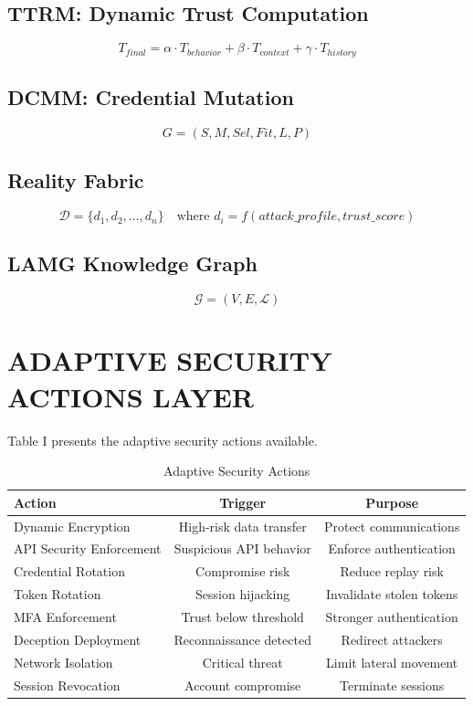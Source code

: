 \documentclass[10pt,journal,compsoc]{IEEEtran}
\begin{document}
\subsection{TTRM: Dynamic Trust Computation}
\begin{equation}
T_{final} = \alpha \cdot T_{behavior} + \beta \cdot T_{context} + \gamma \cdot T_{history}
\label{eq:trust}
\end{equation}

\subsection{DCMM: Credential Mutation}
\begin{equation}
G = (S, M, Sel, Fit, L, P)
\label{eq:genome}
\end{equation}

\subsection{Reality Fabric}
\begin{equation}
\mathcal{D} = \{d_1, d_2, \ldots, d_n\} \quad \text{where } d_i = f(attack\_profile, trust\_score)
\label{eq:deception}
\end{equation}

\subsection{LAMG Knowledge Graph}
\begin{equation}
\mathcal{G} = (V, E, \mathcal{L})
\label{eq:graph}
\end{equation}

\section{ADAPTIVE SECURITY ACTIONS LAYER}
Table I presents the adaptive security actions available.

\begin{table}[H]
\centering
\caption{Adaptive Security Actions}
\scriptsize
\begin{tabular}{|l|c|c|}
\hline
\textbf{Action} & \textbf{Trigger} & \textbf{Purpose} \\
\hline
Dynamic Encryption & High-risk data transfer & Protect communications \\
API Security Enforcement & Suspicious API behavior & Enforce authentication \\
Credential Rotation & Compromise risk & Reduce replay risk \\
Token Rotation & Session hijacking & Invalidate stolen tokens \\
MFA Enforcement & Trust below threshold & Stronger authentication \\
Deception Deployment & Reconnaissance detected & Redirect attackers \\
Network Isolation & Critical threat & Limit lateral movement \\
Session Revocation & Account compromise & Terminate sessions \\
\hline
\end{tabular}
\label{tab:actions}
\end{table}
\end{document}
